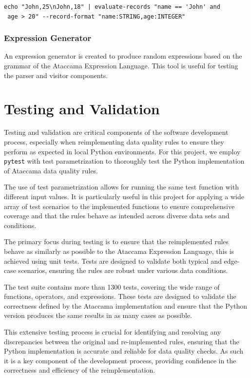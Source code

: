 \begin{verbatim}
echo "John,25\nJohn,18" | evaluate-records "name == 'John' and
 age > 20" --record-format "name:STRING,age:INTEGER"
\end{verbatim}

\subsubsection{Expression Generator}

An expression generator is created to produce random expressions based on the grammar of the Ataccama Expression Language. This tool is useful for testing the parser and visitor components.

\section{Testing and Validation}

Testing and validation are critical components of the software development process, especially when reimplementing data quality rules to ensure they perform as expected in local Python environments. For this project, we employ \texttt{pytest} with test parametrization to thoroughly test the Python implementation of Ataccama data quality rules.

The use of test parametrization allows for running the same test function with different input values. It is particularly useful in this project for applying a wide array of test scenarios to the implemented functions to ensure comprehensive coverage and that the rules behave as intended across diverse data sets and conditions.

The primary focus during testing is to ensure that the reimplemented rules behave as similarly as possible to the Ataccama Expression Language, this is achieved using unit tests. Tests are designed to validate both typical and edge-case scenarios, ensuring the rules are robust under various data conditions.

The test suite contains more than 1300 tests, covering the wide range of functions, operators, and expressions. These tests are designed to validate the correctness defined by the Ataccama implementation and ensure that the Python version produces the same results in as many cases as possible.

This extensive testing process is crucial for identifying and resolving any discrepancies between the original and re-implemented rules, ensuring that the Python implementation is accurate and reliable for data quality checks. As such it is a key component of the development process, providing confidence in the correctness and efficiency of the reimplementation.

